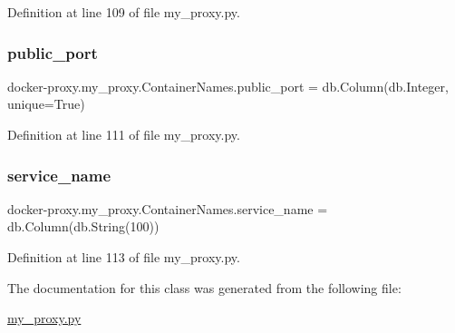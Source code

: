 Definition at line 109 of file my\+\_\+proxy.\+py.

\hypertarget{classdocker-proxy_1_1my__proxy_1_1_container_names_accfbd6e258c7ede9ac75360c54086e2a}{}\label{classdocker-proxy_1_1my__proxy_1_1_container_names_accfbd6e258c7ede9ac75360c54086e2a} 
\subsubsection{\texorpdfstring{public\+\_\+port}{public\_port}}
{\footnotesize\ttfamily docker-\/proxy.\+my\+\_\+proxy.\+Container\+Names.\+public\+\_\+port = db.\+Column(db.\+Integer, unique=True)\hspace{0.3cm}{\ttfamily [static]}}



Definition at line 111 of file my\+\_\+proxy.\+py.

\hypertarget{classdocker-proxy_1_1my__proxy_1_1_container_names_ac067fae0674728a7064586300ef6b107}{}\label{classdocker-proxy_1_1my__proxy_1_1_container_names_ac067fae0674728a7064586300ef6b107} 
\subsubsection{\texorpdfstring{service\+\_\+name}{service\_name}}
{\footnotesize\ttfamily docker-\/proxy.\+my\+\_\+proxy.\+Container\+Names.\+service\+\_\+name = db.\+Column(db.\+String(100))\hspace{0.3cm}{\ttfamily [static]}}



Definition at line 113 of file my\+\_\+proxy.\+py.



The documentation for this class was generated from the following file\+:\begin{DoxyCompactItemize}
\item 
\hyperlink{my__proxy_8py}{my\+\_\+proxy.\+py}\end{DoxyCompactItemize}
